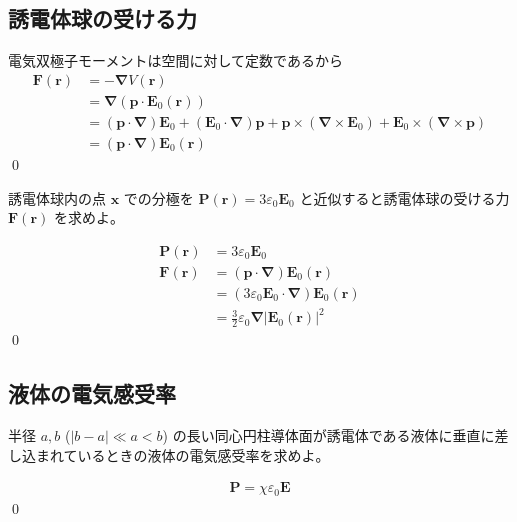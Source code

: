 \documentclass[uplatex,dvipdfmx,a4paper,11pt]{jlreq}
\makeatletter
\newcommand{\EE}{\bm{E}}
\newcommand{\rr}{\bm{r}}
\newcommand{\pp}{\bm{p}}
\newcommand{\vnabla}{\mathbf{\nabla}}
\theoremstyle{definition}
\renewenvironment{proof}[1][\proofname]{\par
  \normalfont
  \topsep6\p@\@plus6\p@ \trivlist
  \item[\hskip\labelsep{\bfseries #1}\@addpunct{\bfseries}]\ignorespaces\quad\par
}{%
  \qed\endtrivlist\@endpefalse
}
\renewcommand\proofname{証明}
\makeatother
\begin{document}
\subsection{誘電体球の受ける力}
\begin{problem}

\end{problem}
\begin{proof}
  電気双極子モーメントは空間に対して定数であるから
  \begin{align}
    \bm{F}(\rr) & = -\vnabla V(\rr)                                                                                                 \\
                & = \vnabla(\pp\cdot\EE_0(\rr))                                                                                     \\
                & = (\pp\cdot\vnabla)\EE_0 + (\EE_0\cdot\vnabla)\pp + \pp\times(\vnabla\times\EE_0) + \EE_0\times(\vnabla\times\pp) \\
                & = (\pp\cdot\vnabla)\EE_0(\rr)
  \end{align}
\end{proof}

\begin{problem}
誘電体球内の点 $\bm{x}$ での分極を $\bm{P}(\rr) = 3\varepsilon_0\EE_0$ と近似すると誘電体球の受ける力 $\bm{F}(\rr)$ を求めよ。
\end{problem}
\begin{proof}
  \begin{align}
    \bm{P}(\rr) & = 3\varepsilon_0\EE_0                           \\
    \bm{F}(\rr) & = (\pp\cdot\vnabla)\EE_0(\rr)                   \\
                & = (3\varepsilon_0\EE_0\cdot\vnabla)\EE_0(\rr)   \\
                & = \frac{3}{2}\varepsilon_0\vnabla|\EE_0(\rr)|^2
  \end{align}
\end{proof}

\subsection{液体の電気感受率}
\begin{problem}
半径 $a, b$ ($|b - a| \ll a < b$) の長い同心円柱導体面が誘電体である液体に垂直に差し込まれているときの液体の電気感受率を求めよ。
\end{problem}
\begin{proof}
  \begin{align}
    \bm{P} = \chi\varepsilon_0\EE
  \end{align}
\end{proof}
\end{document}
